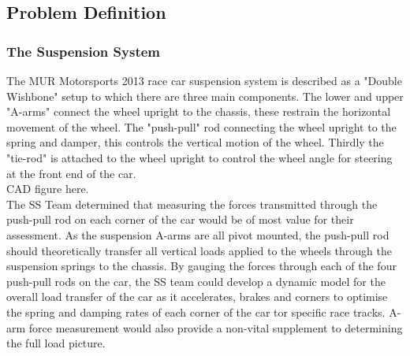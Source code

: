 \subsection{Problem Definition}
\subsubsection{The Suspension System}
The MUR Motorsports 2013 race car suspension system is described as a "Double Wishbone" setup to which there are three main components. The lower and upper "A-arms" connect the wheel upright to the chassis, these restrain the horizontal movement of the wheel. The "push-pull" rod connecting the wheel upright to the spring and damper, this controls the vertical motion of the wheel. Thirdly the "tie-rod" is attached to the wheel upright to control the wheel angle for steering at the front end of the car.\\

CAD figure here.\\

The SS Team determined that measuring the forces transmitted through the push-pull rod on each corner of the car would be of most value for their assessment. As the suspension A-arms are all pivot mounted, the push-pull rod should theoretically transfer all vertical loads applied to the wheels through the suspension springs to the chassis. By gauging the forces through each of the four push-pull rods on the car, the SS team could develop a dynamic model for the overall load transfer of the car as it accelerates, brakes and corners to optimise the spring and damping rates of each corner of the car tor specific race tracks. A-arm force measurement would also provide a non-vital supplement to determining the full load picture. 

